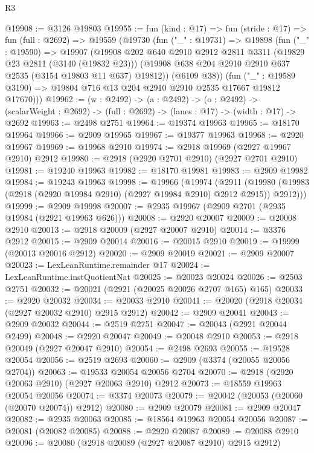 \begin{lexlean}{R3}
\begin{coremodule}
@19908 := @3126 @19803
@19955 := fun (kind : @17) =>
  fun (stride : @17) =>
  fun (full : @2692) =>
  @19559
    (@19730
      (fun ("_" : @19731) =>
      @19898
        (fun ("_" : @19590) =>
        @19907
          (@19908
            @202
            @640
            @2910
            @2912
            @2811
            @3311
            (@19829 @23 @2811 (@3140 (@19832 @23)))
            (@19908 @638 @204 @2910 @2910 @637 @2535 (@3154 @19803 @11 @637) @19812))
          (@6109 @38))
        (fun ("_" : @19589 @3190) => @19804 @716 @13 @204 @2910 @2910 @2535 @17667 @19812 @17670)))
@19962 := (w : @2492) ->
  (a : @2492) ->
  (o : @2492) -> (scalarWeight : @2692) -> (full : @2692) -> (lanes : @17) -> (width : @17) -> @2692
@19963 := @2498 @2751
@19964 := @19374 @19963
@19965 := @18170 @19964
@19966 := @2909 @19965
@19967 := @19377 @19963
@19968 := @2920 @19967
@19969 := @19968 @2910
@19974 := @2918 @19969 (@2927 @19967 @2910) @2912
@19980 := @2918 (@2920 @2701 @2910) (@2927 @2701 @2910)
@19981 := @19240 @19963
@19982 := @18170 @19981
@19983 := @2909 @19982
@19984 := @19243 @19963
@19998 := @19966
    (@19974
      (@2911 (@19980 (@19983 (@2918 (@2920 @19984 @2910) (@2927 @19984 @2910) @2912 @2915)) @2912)))
@19999 := @2909 @19998
@20007 := @2935 @19967 (@2909 @2701 (@2935 @19984 (@2921 @19963 @626)))
@20008 := @2920 @20007
@20009 := @20008 @2910
@20013 := @2918 @20009 (@2927 @20007 @2910)
@20014 := @3376 @2912
@20015 := @2909 @20014
@20016 := @20015 @2910
@20019 := @19999 (@20013 @20016 @2912)
@20020 := @2909 @20019
@20021 := @2909 @20007
@20023 := LexLeanRuntime.remainder @17
@20024 := LexLeanRuntime.instQuotientNat
@20025 := @20023 @20024
@20026 := @2503 @2751
@20032 := @20021 (@2921 (@20025 @20026 @2707 @165) @165)
@20033 := @2920 @20032
@20034 := @20033 @2910
@20041 := @20020 (@2918 @20034 (@2927 @20032 @2910) @2915 @2912)
@20042 := @2909 @20041
@20043 := @2909 @20032
@20044 := @2519 @2751
@20047 := @20043 (@2921 @20044 @2499)
@20048 := @2920 @20047
@20049 := @20048 @2910
@20053 := @2918 @20049 (@2927 @20047 @2910)
@20054 := @2498 @2693
@20055 := @19528 @20054
@20056 := @2519 @2693
@20060 := @2909 (@3374 (@20055 @20056 @2704))
@20063 := @19533 @20054 @20056 @2704
@20070 := @2918 (@2920 @20063 @2910) (@2927 @20063 @2910) @2912
@20073 := @18559 @19963 @20054 @20056
@20074 := @3374 @20073
@20079 := @20042 (@20053 (@20060 (@20070 @20074)) @2912)
@20080 := @2909 @20079
@20081 := @2909 @20047
@20082 := @2935 @20063
@20085 := @18564 @19963 @20054 @20056
@20087 := @20081 (@20082 @20085)
@20088 := @2920 @20087
@20089 := @20088 @2910
@20096 := @20080 (@2918 @20089 (@2927 @20087 @2910) @2915 @2912)

\end{coremodule}
\end{lexlean}

